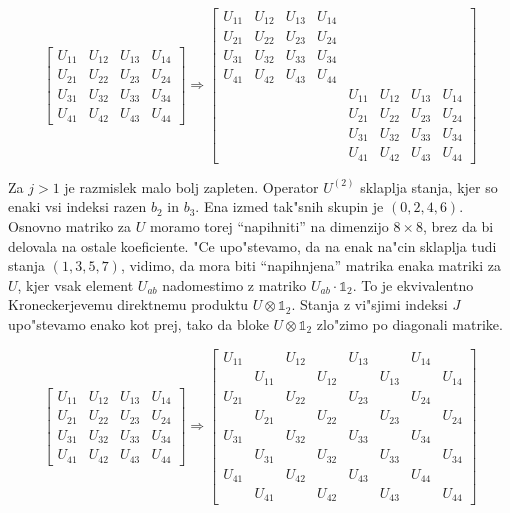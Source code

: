 \documentclass[a4paper,10pt]{article}
\begin{document}
\begin{equation}
 \begin{bmatrix}
  U_{11} & U_{12} & U_{13} & U_{14} \\
  U_{21} & U_{22} & U_{23} & U_{24} \\
  U_{31} & U_{32} & U_{33} & U_{34} \\
  U_{41} & U_{42} & U_{43} & U_{44}
  \end{bmatrix} \Rightarrow \begin{bmatrix}
  U_{11} & U_{12} & U_{13} & U_{14} & & & \\
  U_{21} & U_{22} & U_{23} & U_{24} & & &\\
  U_{31} & U_{32} & U_{33} & U_{34} & & &  \\
  U_{41} & U_{42} & U_{43} & U_{44} & & & \\
  & & & & U_{11} & U_{12} & U_{13} & U_{14} \\
  & & & & U_{21} & U_{22} & U_{23} & U_{24} \\
  & & & & U_{31} & U_{32} & U_{33} & U_{34} \\
  & & & & U_{41} & U_{42} & U_{43} & U_{44}
  \end{bmatrix}
\end{equation}

Za $j>1$ je razmislek malo bolj zapleten. Operator $U^{(2)}$ sklaplja stanja, kjer so enaki vsi indeksi razen $b_2$ in $b_3$. Ena izmed tak"snih skupin je $(0, 2, 4, 6)$.
Osnovno matriko za $U$ moramo torej ``napihniti'' na dimenzijo $8\times 8$, brez da bi delovala na ostale koeficiente. 
"Ce upo"stevamo, da na enak na"cin sklaplja tudi stanja $(1, 3, 5, 7)$, vidimo, da mora biti ``napihnjena'' matrika enaka matriki za $U$, kjer vsak element $U_{ab}$ nadomestimo z matriko $U_{ab}\cdot \mathbb{1}_2$. 
To je ekvivalentno Kroneckerjevemu direktnemu produktu $U \otimes \mathbb{1}_2$. 
Stanja z vi"sjimi indeksi $J$ upo"stevamo enako kot prej, tako da bloke $U \otimes \mathbb{1}_2$ zlo"zimo po diagonali matrike. 

\begin{equation}
 \begin{bmatrix}
  U_{11} & U_{12} & U_{13} & U_{14} \\
  U_{21} & U_{22} & U_{23} & U_{24} \\
  U_{31} & U_{32} & U_{33} & U_{34} \\
  U_{41} & U_{42} & U_{43} & U_{44}
  \end{bmatrix} \Rightarrow \begin{bmatrix}
  U_{11} & & U_{12} & & U_{13} & & U_{14} & \\
  & U_{11} & & U_{12} & & U_{13} & & U_{14} \\
  U_{21} & & U_{22} & & U_{23} & & U_{24} & \\
  & U_{21} & & U_{22} & & U_{23} & & U_{24} \\
  U_{31} & & U_{32} & & U_{33} & & U_{34} &\\
  & U_{31} & & U_{32} & & U_{33} & & U_{34} \\
  U_{41} & & U_{42} & & U_{43} & & U_{44} & \\
  & U_{41} & & U_{42} & & U_{43} & & U_{44}
  \end{bmatrix}
\end{equation}
\end{document}
